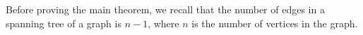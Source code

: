 \documentclass{article}
\begin{document}
Before proving the main theorem, we recall that the number of edges in a spanning tree of a graph is $n - 1$, where $n$ is the number of vertices in the graph.
\end{document}
